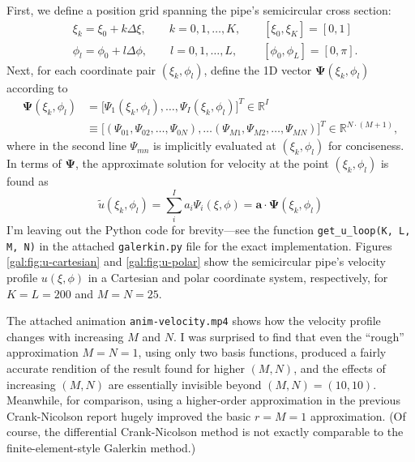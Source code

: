 \documentclass[11pt, a4paper]{article}
\renewcommand{\t}[1]{\tilde{#1}}
\renewcommand{\vec}[1]{\bm{#1}}
\begin{document}
First, we define a position grid spanning the pipe's semicircular cross section:
\begin{align*}
	& \xi_{k} = \xi_{0} + k \Delta \xi, \qquad k = 0, 1, \ldots, K, \qquad [\xi_{0}, \xi_{K}] = [0, 1]\\
	& \phi_{l} = \phi_{0} + l \Delta \phi, \qquad l = 0, 1, \ldots, L, \qquad \ [\phi_{0}, \phi_{L}] = [0, \pi].
\end{align*}
Next, for each coordinate pair $ (\xi_{k}, \phi_{l}) $, define the 1D vector $ \bm{\Psi}(\xi_{k}, \phi_{l}) $ according to
\begin{align*}
	\bm{\Psi}(\xi_{k}, \phi_{l}) &= \big[\Psi_{1}(\xi_{k}, \phi_{l}), \ldots, \Psi_{I}(\xi_{k}, \phi_{l}) \big]^{T} \in \mathbb{R}^{I}\\
	& \equiv \big[(\Psi_{01}, \Psi_{02}, \ldots, \Psi_{0N})\bm{,} \ldots (\Psi_{M1}, \Psi_{M2}, \ldots, \Psi_{MN})\big]^{T} \in \mathbb{R}^{N\cdot(M+1)},
\end{align*}
where in the second line $ \Psi_{mn} $ is implicitly evaluated at $ (\xi_{k}, \phi_{l}) $ for conciseness. In terms of $ \vec{\Psi} $, the approximate solution for velocity at the point $ (\xi_{k}, \phi_{l}) $ is found as 
\begin{equation*}
	\t{u}(\xi_{k}, \phi_{l}) = \sum_{i}^{I}a_{i}\Psi_{i}(\xi, \phi) = \bm{a} \cdot \bm{\Psi}(\xi_{k}, \phi_{l})
\end{equation*}
I'm leaving out the Python code for brevity---see the function \texttt{get\_u\_loop(K, L, M, N)} in the attached \texttt{galerkin.py} file for the exact implementation. Figures \ref{gal:fig:u-cartesian} and \ref{gal:fig:u-polar} show the semicircular pipe's velocity profile $ u(\xi, \phi) $ in a Cartesian and polar coordinate system, respectively, for $ K = L = 200 $ and $ M = N = 25 $. 

\vspace{2mm}
The attached animation \texttt{anim-velocity.mp4} shows how the velocity profile changes with increasing $ M $ and $ N $. I was surprised to find that even the ``rough'' approximation $ M = N = 1 $, using only two basis functions, produced a fairly accurate rendition of the result found for higher $ (M, N) $, and the effects of increasing $ (M, N) $ are essentially invisible beyond $ (M, N) = (10, 10) $. Meanwhile, for comparison, using a higher-order approximation in the previous Crank-Nicolson report hugely improved the basic $ r = M = 1 $ approximation. (Of course, the differential Crank-Nicolson method is not exactly comparable to the finite-element-style Galerkin method.)
\end{document}
